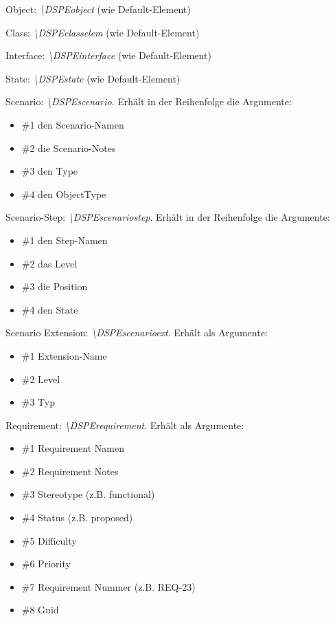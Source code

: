 {Object: \textit{\textbackslash{}DSPEobject }(wie Default-Element)

Class: \textit{\textbackslash{}DSPEclasselem }(wie Default-Element)

Interface: \textit{\textbackslash{}DSPEinterface} (wie Default-Element)

State: \textit{\textbackslash{}DSPEstate  }(wie Default-Element)

Scenario: \textit{\textbackslash{}DSPEscenario}.  Erhält in der Reihenfolge die Argumente:
\begin{itemize}
	\item \#1 den Scenario-Namen
	\item \#2 die Scenario-Notes
	\item \#3 den Type
	\item \#4 den ObjectType
\end{itemize}

Scenario-Step: \textit{\textbackslash{}DSPEscenariostep}. Erhält in der Reihenfolge die Argumente:
\begin{itemize}
	\item \#1 den Step-Namen
	\item \#2 das Level
	\item \#3 die Position
	\item \#4 den State
\end{itemize}

Scenario Extension: \textit{\textbackslash{}DSPEscenarioext}. Erhält  als Argumente:
\begin{itemize}
	\item \#1 Extension-Name
	\item \#2 Level
	\item \#3 Typ
\end{itemize}

Requirement: \textit{\textbackslash{}DSPErequirement}. Erhält als Argumente:
\begin{itemize}
	\item \#1 Requirement Namen
	\item \#2 Requirement Notes
	\item \#3 Stereotype (z.B. functional)
	\item \#4 Status (z.B. proposed)
	\item \#5 Difficulty
	\item \#6 Priority
	\item \#7 Requirement Nummer (z.B. REQ-23)
	\item \#8 Guid
\end{itemize}

}
